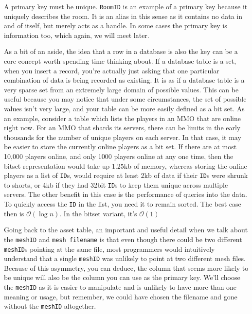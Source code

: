 \documentclass[a4paper,12pt]{book}
\begin{document}
A primary key must be unique.
\texttt{RoomID} is an example of a primary key because it uniquely describes the room.
It is an alias in this sense as it contains no data in and of itself, but merely acts as a handle.
In some cases the primary key is information too, which again, we will meet later.

As a bit of an aside, the idea that a row in a database is also the key can be a core concept worth spending time thinking about.
If a database table is a set, when you insert a record, you're actually just asking that one particular combination of data is being recorded as existing.
It is as if a database table is a very sparse set from an extremely large domain of possible values.
This can be useful because you may notice that under some circumstances, the set of possible values isn't very large, and your table can be more easily defined as a bit set.
As an example, consider a table which lists the players in an MMO that are online right now.
For an MMO that shards its servers, there can be limits in the early thousands for the number of unique players on each server.
In that case, it may be easier to store the currently online players as a bit set.
If there are at most 10,000 players online, and only 1000 players online at any one time, then the bitset representation would take up 1.25kb of memory, whereas storing the online players as a list of \texttt{ID}s, would require at least 2kb of data if their \texttt{ID}s were shrunk to shorts, or 4kb if they had 32bit \texttt{ID}s to keep them unique across multiple servers.
The other benefit in this case is the performance of queries into the data.
To quickly access the \texttt{ID} in the list, you need it to remain sorted.
The best case then is $ \mathcal{O}(\log{}n)$. In the bitset variant, it's $ \mathcal{O}(1)$

Going back to the asset table, an important and useful detail when we talk about the \texttt{meshID} and \texttt{mesh filename} is that even though there could be two different \texttt{meshID}s pointing at the same file, most programmers would intuitively understand that a single \texttt{meshID} was unlikely to point at two different mesh files.
Because of this asymmetry, you can deduce, the column that seems more likely to be unique will also be the column you can use as the primary key.
We'll choose the \texttt{meshID} as it is easier to manipulate and is unlikely to have more than one meaning or usage, but remember, we could have chosen the filename and gone without the \texttt{meshID} altogether.
\end{document}
